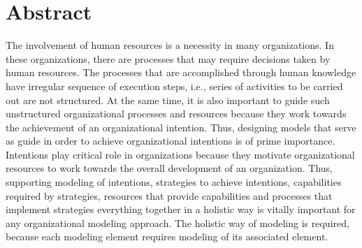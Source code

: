 \documentclass[
               fontsize=12pt, %
               paper=a4,
               twoside, %
               BCOR=3mm, %
               DIV=13,   %
               headinclude=true,
               footinclude=false,
               bibliography=totoc,
               headsepline,
               cleardoublepage=empty,
               parskip=half,
               pointlessnumbers, %
               final   %
               ]{scrbook}
\begin{document}
\section*{Abstract}

The involvement of human resources is a necessity in many organizations. In these organizations, there are processes that may require decisions taken by human resources. The processes that are accomplished through human knowledge have irregular sequence of execution steps, i.e., series of activities to be carried out are not structured. At the same time, it is also important to guide such unstructured organizational processes and resources because they work towards the achievement of an organizational intention. Thus, designing models that serve as guide in order to achieve organizational intentions is of prime importance. Intentions play critical role in organizations because they motivate organizational resources to work towards the overall development of an organization. Thus, supporting modeling of intentions, strategies to achieve intentions, capabilities required by strategies,  resources that provide capabilities and processes that implement strategies everything together in a holistic way is vitally important for any organizational modeling approach. The holistic way of modeling is required, because each modeling element requires modeling of its associated element. 
\end{document}
